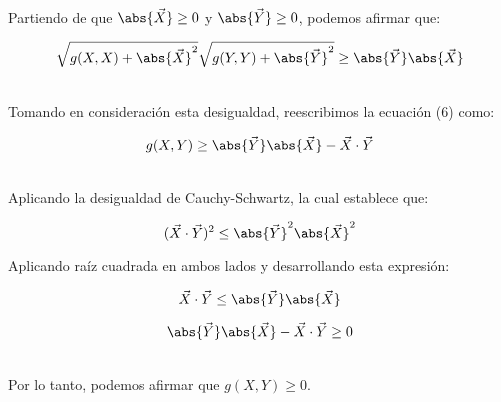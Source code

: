 \documentclass[12pt, A4,spanish,]{report}
\begin{document}
\\
Partiendo de que $\abs{\vec{X}}\geq0$ y $\abs{\vec{Y}}\geq0$, podemos afirmar que: 

\[\sqrt{g(X,X)+\abs{\vec{X}}^2}\sqrt{g(Y,Y)+\abs{\vec{Y}}^2}\geq\abs{\vec{Y}}\abs{\vec{X}}\]

\\
Tomando en consideración esta desigualdad, reescribimos la ecuación (6) como:

\[g(X,Y)\geq\abs{\vec{Y}}\abs{\vec{X}}-\vec{X}\cdot\vec{Y}\]

\\
Aplicando la desigualdad de Cauchy-Schwartz, la cual establece que:

\[(\vec{X}\cdot\vec{Y})^2 \leq \abs{\vec{Y}}^2\abs{\vec{X}}^2 \]

Aplicando raíz cuadrada en ambos lados y desarrollando esta expresión:

\[\vec{X}\cdot\vec{Y} \leq \abs{\vec{Y}}\abs{\vec{X}} \]

\[  \abs{\vec{Y}}\abs{\vec{X}} - \vec{X}\cdot\vec{Y} \geq 0 \]

\\
Por lo tanto, podemos afirmar que $g(X,Y)\geq0$.
\\
\end{document}
